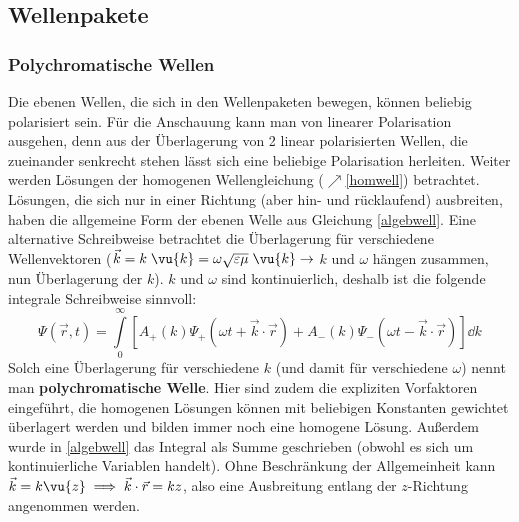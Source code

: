  \subsection{Wellenpakete}
 \subsubsection{Polychromatische Wellen}
 Die ebenen Wellen, die sich in den Wellenpaketen bewegen, können beliebig polarisiert sein. Für die Anschauung kann man von linearer Polarisation ausgehen, denn aus der Überlagerung von 2 linear polarisierten Wellen, die zueinander senkrecht stehen lässt sich eine beliebige Polarisation herleiten. Weiter werden Lösungen der homogenen Wellengleichung ($\nearrow$\ref{homwell}) betrachtet. Lösungen, die sich nur in einer Richtung (aber hin- und rücklaufend) ausbreiten, haben die allgemeine Form der ebenen Welle aus Gleichung \ref{algebwell}. Eine alternative Schreibweise betrachtet die Überlagerung für verschiedene Wellenvektoren (\(\vec{k} =  k\; \vu{k} = \omega\sqrt{\varepsilon\mu}\;\vu{k}\to\) $k$ und $\omega$ hängen zusammen, nun Überlagerung der $k$). $k$ und $\omega$ sind kontinuierlich, deshalb ist die folgende integrale Schreibweise sinnvoll:
		        \begin{equation}
			        \boxed{\Psi (\vec{r} , t) = \int\limits_{0}^\infty \left[ A_+(k) \Psi_+ (\omega t + \vec{k}\cdot\vec{r} ) + A_-(k) \Psi_- (\omega t - \vec{k}\cdot\vec{r} ) \right] \dd  k}
		        \end{equation}
		        Solch eine Überlagerung für verschiedene $k$ (und damit für verschiedene $\omega$) nennt man \textbf{polychromatische Welle}. Hier sind zudem die expliziten Vorfaktoren eingeführt, die homogenen Lösungen können mit beliebigen Konstanten gewichtet überlagert werden und bilden immer noch eine homogene Lösung. Außerdem wurde in \ref{algebwell} das Integral als Summe geschrieben (obwohl es sich um kontinuierliche Variablen handelt). 
		   Ohne Beschränkung der Allgemeinheit kann \(\vec{k} =  k \vu{z}   \implies \vec{k}\cdot\vec{r}  =  k z\), also eine Ausbreitung entlang der \(z\)-Richtung angenommen werden.

